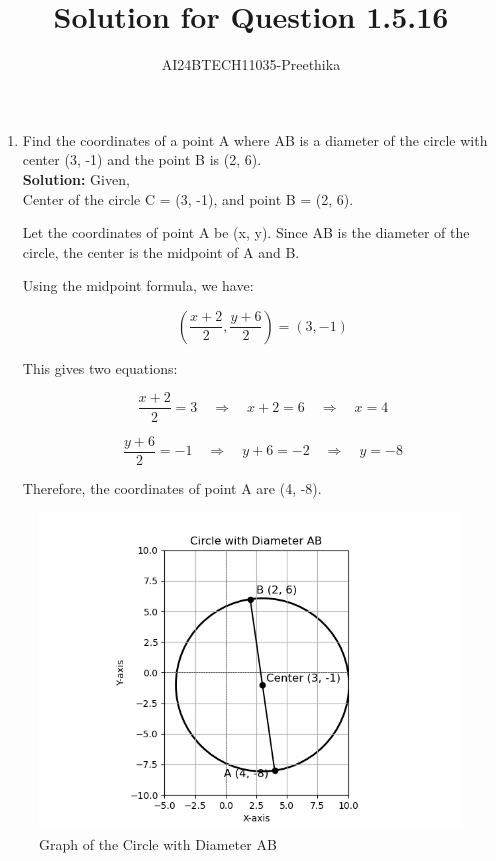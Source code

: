 \documentclass[journal,12pt,onecolumn]{IEEEtran}
\begin{document}


\vspace{3cm}
\title{Solution for Question 1.5.16}
\author{AI24BTECH11035-Preethika}
\maketitle

\begin{enumerate}
    \item Find the coordinates of a point A where AB is a diameter of the circle with center (3, -1) and the point B is (2, 6).\\
    
    \textbf{Solution:} Given,\\
    Center of the circle C = (3, -1), and point B = (2, 6).
    
    Let the coordinates of point A be (x, y).  
    Since AB is the diameter of the circle, the center is the midpoint of A and B.
    
    Using the midpoint formula, we have:
    
\[
    \left( \frac{x + 2}{2}, \frac{y + 6}{2} \right) = (3, -1)
\]
    
    This gives two equations:
    
\[
    \frac{x + 2}{2} = 3 \quad \Rightarrow \quad x + 2 = 6 \quad \Rightarrow \quad x = 4
\]
    
\[
    \frac{y + 6}{2} = -1 \quad \Rightarrow \quad y + 6 = -2 \quad \Rightarrow \quad y = -8
\]
    
    Therefore, the coordinates of point A are (4, -8).
    
\end{enumerate}

\begin{figure}[ht]
   \centering
   \includegraphics[width=0.7\linewidth]{Figs/fig_1.png}
   \caption{Graph of the Circle with Diameter AB}
   \label{q16}
\end{figure}
\end{document}
